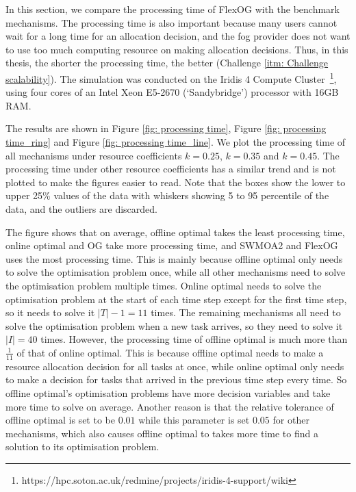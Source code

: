 \documentclass[11pt]{phdthesis}
\begin{document}
In this section, we compare the processing time of FlexOG with the benchmark mechanisms. The processing time is also important because many users cannot wait for a long time for an allocation decision, and the fog provider does not want to use too much computing resource on making allocation decisions. Thus, in this thesis, the shorter the processing time, the better (Challenge \ref{itm: Challenge scalability}). The simulation was conducted on the Iridis 4 Compute Cluster~\footnote{https://hpc.soton.ac.uk/redmine/projects/iridis-4-support/wiki}, using four cores of an Intel Xeon E5-2670 (`Sandybridge') processor with 16GB RAM. 

The results are shown in Figure \ref{fig: processing time}, Figure \ref{fig: processing time_ring} and Figure \ref{fig: processing time_line}. We plot the processing time of all mechanisms under resource coefficients $ k = 0.25 $, $ k = 0.35 $ and $k = 0.45 $. The processing time under other resource coefficients has a similar trend and is not plotted to make the figures easier to read. Note that the boxes show the lower to upper 25\% values of the data with whiskers showing 5 to 95 percentile of the data, and the outliers are discarded. 

The figure shows that on average, offline optimal takes the least processing time, online optimal and OG take more processing time, and SWMOA2 and FlexOG uses the most processing time. This is mainly because offline optimal only needs to solve the optimisation problem once, while all other mechanisms need to solve the optimisation problem multiple times. Online optimal needs to solve the optimisation problem at the start of each time step except for the first time step, so it needs to solve it $ |T| - 1 = 11 $ times. The remaining mechanisms all need to solve the optimisation problem when a new task arrives, so they need to solve it $ |I| = 40 $ times. However, the processing time of offline optimal is much more than $ \frac{1}{11} $ of that of online optimal. This is because offline optimal needs to make a resource allocation decision for all tasks at once, while online optimal only needs to make a decision for tasks that arrived in the previous time step every time. So offline optimal's optimisation problems have more decision variables and take more time to solve on average. Another reason is that the relative tolerance of offline optimal is set to be $ 0.01 $ while this parameter is set $ 0.05 $ for other mechanisms, which also causes offline optimal to takes more time to find a solution to its optimisation problem.
\end{document}
